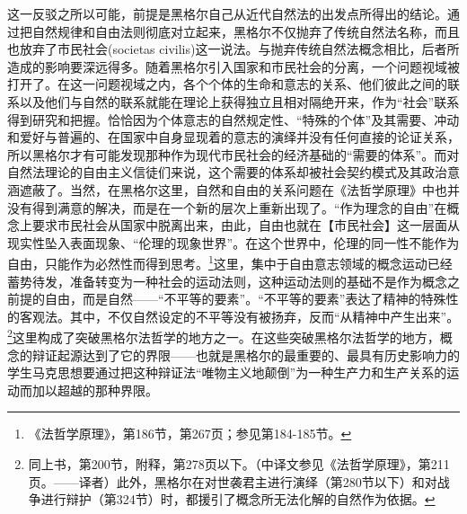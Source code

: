这一反驳之所以可能，前提是黑格尔自己从近代自然法的出发点所得出的结论。通过把自然规律和自由法则彻底对立起来，黑格尔不仅抛弃了传统自然法名称，而且也放弃了市民社会(societas civilis)这一说法。与抛弃传统自然法概念相比，后者所造成的影响要深远得多。随着黑格尔引入国家和市民社会的分离，一个问题视域被打开了。在这一问题视域之内，各个个体的生命和意志的关系、他们彼此之间的联系以及他们与自然的联系就能在理论上获得独立且相对隔绝开来，作为“社会”联系得到研究和把握。恰恰因为个体意志的自然规定性、“特殊的个体”及其需要、冲动和爱好与普遍的、在国家中自身显现着的意志的演绎并没有任何直接的论证关系，所以黑格尔才有可能发现那种作为现代市民社会的经济基础的“需要的体系”。而对自然法理论的自由主义信徒们来说，这个需要的体系却被社会契约模式及其政治意涵遮蔽了。当然，在黑格尔这里，自然和自由的关系问题在《法哲学原理》中也并没有得到满意的解决，而是在一个新的层次上重新出现了。“作为理念的自由”在概念上要求市民社会从国家中脱离出来，由此，自由也就在【市民社会】这一层面从现实性坠入表面现象、“伦理的现象世界”。在这个世界中，伦理的同一性不能作为自由，只能作为必然性而得到思考。\footnote{《法哲学原理》，第186节，第267页；参见第184-185节。}这里，集中于自由意志领域的概念运动已经蓄势待发，准备转变为一种社会的运动法则，这种运动法则的基础不是作为概念之前提的自由，而是自然——“不平等的要素”。“不平等的要素”表达了精神的特殊性的客观法。其中，不仅自然设定的不平等没有被扬弃，反而“从精神中产生出来”。\footnote{同上书，第200节，附释，第278页以下。（中译文参见《法哲学原理》，第211页。——译者）此外，黑格尔在对世袭君主进行演绎（第280节以下）和对战争进行辩护（第324节）时，都援引了概念所无法化解的自然作为依据。}这里构成了突破黑格尔法哲学的地方之一。在这些突破黑格尔法哲学的地方，概念的辩证起源达到了它的界限——也就是黑格尔的最重要的、最具有历史影响力的学生马克思想要通过把这种辩证法“唯物主义地颠倒”为一种生产力和生产关系的运动而加以超越的那种界限。